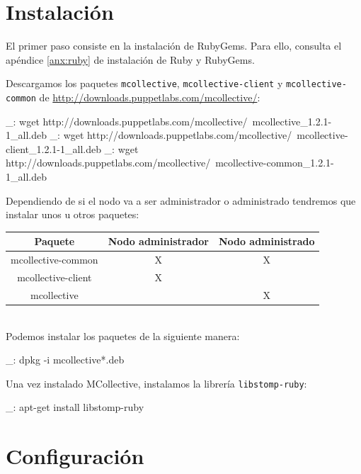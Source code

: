 \section{Instalación}

El primer paso consiste en la instalación de RubyGems. Para ello, consulta el apéndice \ref{anx:ruby} de instalación de Ruby y RubyGems.

Descargamos los paquetes \texttt{mcollective}, \texttt{mcollective-client} y \texttt{mcollective-common} de \url{http://downloads.puppetlabs.com/mcollective/}:

\begin{bashcode}
_: wget http://downloads.puppetlabs.com/mcollective/\
mcollective_1.2.1-1_all.deb
_: wget http://downloads.puppetlabs.com/mcollective/\
mcollective-client_1.2.1-1_all.deb
_: wget http://downloads.puppetlabs.com/mcollective/\
mcollective-common_1.2.1-1_all.deb
\end{bashcode}

Dependiendo de si el nodo va a ser administrador o administrado tendremos que instalar unos u otros paquetes:

\begin{tabular}{|c|c|c|}
   \hline
   Paquete & Nodo administrador & Nodo administrado \\ \hline
   mcollective-common & X & X \\ \hline
   mcollective-client & X &   \\ \hline
   mcollective &  & X \\ \hline
\end{tabular}
\\

Podemos instalar los paquetes de la siguiente manera:

\begin{bashcode}
_: dpkg -i mcollective*.deb
\end{bashcode}

Una vez instalado MCollective, instalamos la librería \texttt{libstomp-ruby}:

\begin{bashcode}
_: apt-get install libstomp-ruby
\end{bashcode}


\section{Configuración}

